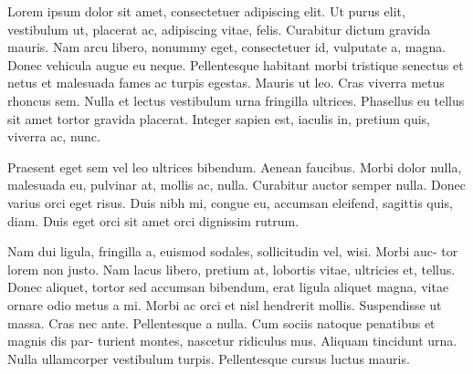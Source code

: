 Lorem ipsum dolor sit amet, consectetuer adipiscing elit. Ut purus elit, vestibulum ut,
placerat ac, adipiscing vitae, felis. Curabitur dictum gravida mauris. Nam arcu libero,
nonummy eget, consectetuer id, vulputate a, magna. Donec vehicula augue eu neque.
Pellentesque habitant morbi tristique senectus et netus et malesuada fames ac turpis
egestas. Mauris ut leo. Cras viverra metus rhoncus sem. Nulla et lectus vestibulum urna
fringilla ultrices. Phasellus eu tellus sit amet tortor gravida placerat. Integer sapien
est, iaculis in, pretium quis, viverra ac, nunc.

Praesent eget sem vel leo ultrices bibendum. Aenean faucibus. Morbi dolor nulla,
malesuada eu, pulvinar at, mollis ac, nulla. Curabitur auctor semper nulla. Donec varius
orci eget risus. Duis nibh mi, congue eu, accumsan eleifend, sagittis quis, diam. Duis
eget orci sit amet orci dignissim rutrum.

Nam dui ligula, fringilla a, euismod sodales, sollicitudin vel, wisi. Morbi auc- tor
lorem non justo. Nam lacus libero, pretium at, lobortis vitae, ultricies et, tellus.
Donec aliquet, tortor sed accumsan bibendum, erat ligula aliquet magna, vitae ornare odio
metus a mi. Morbi ac orci et nisl hendrerit mollis. Suspendisse ut massa. Cras nec ante.
Pellentesque a nulla. Cum sociis natoque penatibus et magnis dis par- turient montes,
nascetur ridiculus mus. Aliquam tincidunt urna. Nulla ullamcorper vestibulum turpis.
Pellentesque cursus luctus mauris.